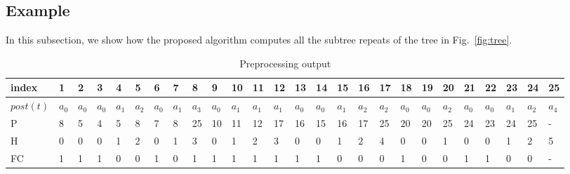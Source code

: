 \documentclass[preprint,12pt]{elsarticle}
\begin{document}
\newpage


\subsection{Example}
In this subsection, we show how the proposed algorithm computes all the subtree repeats of the tree in Fig.~\ref{fig:tree}.

\begin{table}{
 \begin{center}
  \begin{tabular}{|@{}l@{}|@{}l@{}|@{}l@{}|@{}l@{}|@{}l@{}|@{}l@{}|@{}l@{}|@{}l@{}|@{}l@{}|@{}l@{}|@{}l@{}|@{}l@{}|@{}l@{}|@{}l@{}|@{}l@{}|@{}l@{}|@{}l@{}|@{}l@{}|@{}l@{}|@{}l@{}|@{}l@{}|@{}l@{}|@{}l@{}|@{}l@{}|@{}l@{}|@{}l@{}|}\hline
   index & 1 & 2 & 3 & 4 & 5 & 6 & 7 & 8 & 9 & 10 & 11 & 12 & 13 & 14 & 15 & 16 & 17 & 18 & 19 & 20 & 21 & 22 & 23 & 24 & 25\\\hline
   $post(t)$ & $a_{0}$ & $a_{0}$ & $a_{0}$ & $a_{1}$ & $a_{2}$ & $a_{0}$ & $a_{1}$ & $a_{3}$ & $a_{0}$ & $a_{1}$ & $a_{1}$ & $a_{1}$ & $a_{0}$ & $a_{0}$ & $a_{1}$ & $a_{2}$ & $a_{2}$ & $a_{0}$ & $a_{0}$ & $a_{2}$ & $a_{0}$ & $a_{0}$ & $a_{1}$ & $a_{2}$ & $a_{4}$\\\hline
   P   & 8 & 5 & 4 & 5 & 8 & 7 & 8 & 25 & 10 & 11 & 12 & 17 & 16 & 15 & 16 & 17 & 25 & 20 & 20 & 25 & 24 & 23 & 24 & 25 & -\\\hline
   H   & 0 & 0 & 0 & 1 & 2 & 0 & 1 & 3 & 0 & 1 & 2 & 3 & 0 & 0 & 1 & 2 & 4 & 0 & 0 & 1 & 0 & 0 & 1 & 2 & 5\\\hline
   FC  & 1 & 1 & 1 & 0 & 0 & 1 & 0 & 1 & 1 & 1 & 1 & 1 & 1 & 1 & 0 & 0 & 0 & 1 & 0 & 0 & 1 & 1 & 0 & 0 & -\\\hline
 \end{tabular}
\caption{Preprocessing output}
\end{center}
		}
		
	\end{table}
\end{document}

